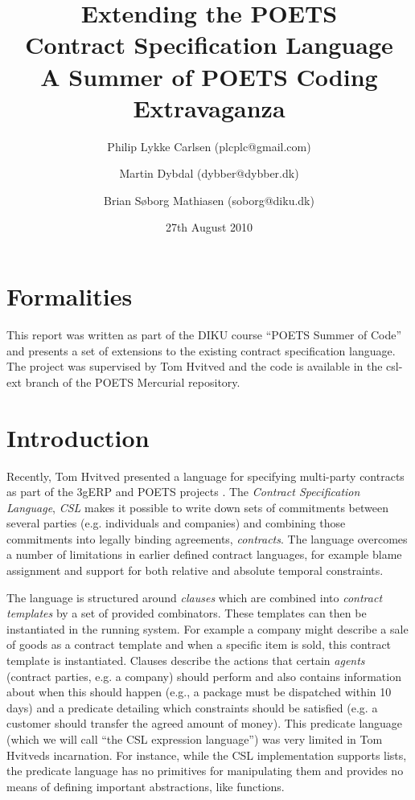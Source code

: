 \documentclass[10pt,a4paper,final,oneside,openany,article]{memoir}
\title{Extending the POETS \\ Contract Specification Language\\
       \vspace{0.1cm}
        \small{A Summer of POETS Coding Extravaganza}}
\author{Philip Lykke Carlsen (plcplc@gmail.com) \and
        Martin Dybdal (dybber@dybber.dk) \and
        Brian Søborg Mathiasen (soborg@diku.dk)}
\date{27th August 2010}
\begin{document}
\listoffixmes
\newpage
\maketitle



\chapter{Formalities}
This report was written as part of the DIKU course ``POETS Summer of
Code'' and presents a set of extensions to the existing contract
specification language. The project was supervised by Tom Hvitved and
the code is available in the csl-ext branch of the
POETS\cite{DBLP:journals/jlp/HengleinLSS09} Mercurial repository.

\chapter{Introduction}
Recently, Tom Hvitved presented a language for specifying multi-party
contracts \cite{hvitved10} as part of the 3gERP and POETS projects
\cite{3gerp}. The \textit{Contract Specification Language},
\textit{CSL} makes it possible to write down sets of commitments
between several parties (e.g. individuals and companies) and combining
those commitments into legally binding agreements,
\textit{contracts}. The language overcomes a number of limitations in
earlier defined contract languages, for example blame assignment and
support for both relative and absolute temporal constraints.

The language is structured around \textit{clauses} which are combined
into \textit{contract templates} by a set of provided
combinators. These templates can then be instantiated in the running
system. For example a company might describe a sale of goods as a
contract template and when a specific item is sold, this contract
template is instantiated. Clauses describe the actions that certain
\textit{agents} (contract parties, e.g. a company) should perform and
also contains information about when this should happen (e.g., a
package must be dispatched within 10 days) and a predicate detailing
which constraints should be satisfied (e.g. a customer should transfer
the agreed amount of money). This predicate language (which we will
call ``the CSL expression language'') was very limited in Tom Hvitveds
incarnation. For instance, while the CSL implementation supports
lists, the predicate language has no primitives for manipulating them
and provides no means of defining important abstractions, like
functions.
\end{document}
